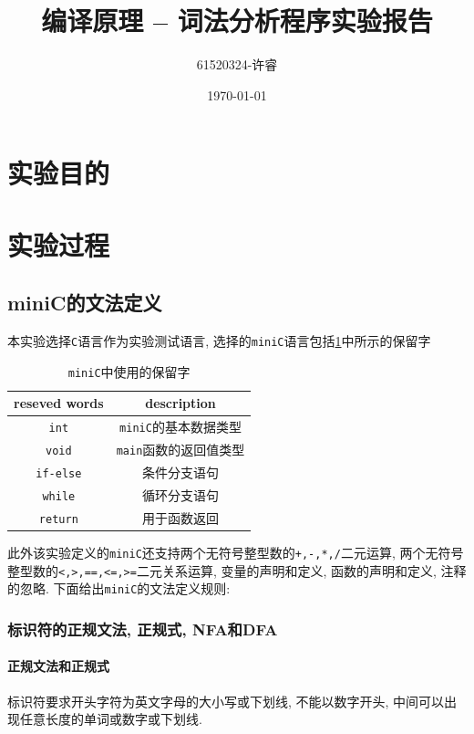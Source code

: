 \documentclass[lang=cn, a4paper]{elegantpaper}
\title{编译原理 -- 词法分析程序实验报告}
\author{61520324-许睿}
\date{\today}
\begin{document}
\maketitle

\section{实验目的}

\section{实验过程}

\subsection{miniC的文法定义}

本实验选择\lstinline|C|语言作为实验测试语言, 选择的\lstinline|miniC|语言包括\ref{tab: reserved}中所示的保留字

\begin{table}[H]
	\begin{center}
	\caption{\lstinline|miniC|中使用的保留字}
	\label{tab: reserved}
	\begin{tabular}{c|c}
		\hline
		\textbf{reseved words} & \textbf{description} \\
		\hline
		\lstinline|int| & \lstinline|miniC|的基本数据类型 \\
		\lstinline|void| & \lstinline|main|函数的返回值类型 \\
		\lstinline|if-else| & 条件分支语句 \\
		\lstinline|while| & 循环分支语句 \\
		\lstinline|return| & 用于函数返回 \\
		\hline
	\end{tabular}
	\end{center}
\end{table}

此外该实验定义的\lstinline|miniC|还支持两个无符号整型数的\lstinline|+,-,*,/|二元运算, 两个无符号整型数的\lstinline|<,>,==,<=,>=|二元关系运算, 变量的声明和定义, 函数的声明和定义, 注释的忽略. 下面给出\lstinline|miniC|的文法定义规则:

\subsubsection{标识符的正规文法, 正规式, NFA和DFA}

\paragraph{正规文法和正规式} 标识符要求开头字符为英文字母的大小写或下划线, 不能以数字开头, 中间可以出现任意长度的单词或数字或下划线.
\end{document}
